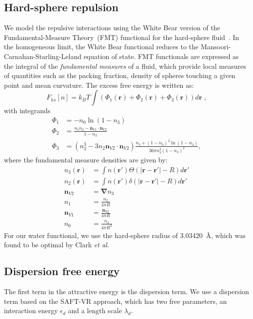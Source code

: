 \documentclass[letterpaper,twocolumn,amsmath,amssymb,prb]{revtex4-1}
\newcommand{\xx}{\textbf{r}}
\begin{document}
\subsection{Hard-sphere repulsion}

We model the repulsive interactions using the White Bear version of
the Fundamental-Measure Theory~(FMT) functional for the hard-sphere
fluid~\cite{roth2002whitebear}.  In the homogeneous limit, the White
Bear functional reduces to the Mansoori-Carnahan-Starling-Leland
equation of state.  FMT functionals are expressed as the integral of
the \emph{fundamental measures} of a fluid, which provide local
measures of quantities such as the packing fraction, density of
spheres touching a given point and mean curvature.  The excess free
energy is written as:
\begin{equation}
F_{hs}[n] = k_B T \int (\Phi_1(\xx) + \Phi_2(\xx) + \Phi_3(\xx)) d\xx \; ,
\end{equation}
with integrands
\begin{align}
\Phi_1 &= -n_0 \ln\left( 1 - n_3\right)\\
\Phi_2 &= \frac{n_1 n_2 - \mathbf{n}_{V1} \cdot\mathbf{n}_{V2}}{1-n_3} \\
\Phi_3 &= (n_2^3 - 3n_2 \mathbf{n}_{V2} \cdot \mathbf{n}_{V2})
  \frac{
    n_3 + (1-n_3)^2\ln(1-n_3)
  }{
    36\pi n_3^2\left( 1 - n_3 \right)^2
  } ,
\end{align}
where the fundamental measure densities are given by:
\begin{align}
  n_3(\xx) &= \int n(\xx') \Theta(\left|\xx - \xx'\right| - R) d\xx' \\
  n_2(\xx) &= \int n(\xx') \delta(\left|\xx - \xx'\right| - R) d\xx'
  \\
  \mathbf{n}_{V2} &= \mathbf{\nabla} n_3 \\
  n_1 &= \frac{n_2}{4\pi R}\\
  \mathbf{n}_{V1} &= \frac{\mathbf{n}_{V2}}{4\pi R}\\
  n_0 &= \frac{n_2}{4\pi R^2}
\end{align}
For our water functional, we use the hard-sphere radius of
3.03420~\AA, which was found to be optimal by Clark
\emph{et al}.\cite{clark2006developing}

\newcommand\etadisp{\ensuremath{\eta_\textit{d}}}
\newcommand\epsilondisp{\ensuremath{\epsilon_\textit{d}}}
\newcommand\epsilonassoc{\ensuremath{\epsilon_\textit{a}}}
\newcommand\lambdadisp{\ensuremath{\lambda_\textit{d}}}
\subsection{Dispersion free energy}
The first term in the attractive energy is the dispersion term.  We use a
dispersion term based on the SAFT-VR
approach\cite{gil-villegas-1997-SAFT-VR}, which has two free
parameters, an interaction energy $\epsilondisp$ and a
length scale $\lambdadisp$.
\end{document}
